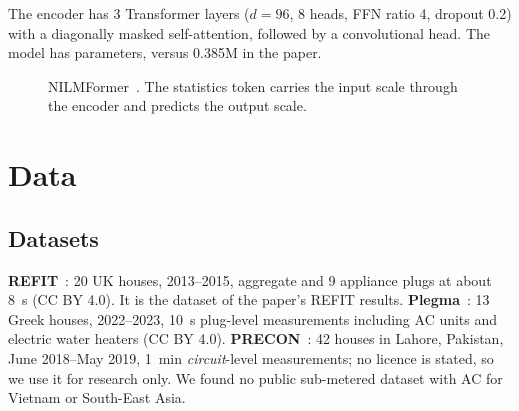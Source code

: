 \documentclass[conference]{IEEEtran}
\begin{document}
The encoder has 3 Transformer layers ($d=96$, 8 heads, FFN ratio 4, dropout 0.2) with a
diagonally masked self-attention, followed by a convolutional head. The model has \NParams{}
parameters, versus 0.385M in the paper.

\begin{figure}[t]
\centering
{}
\caption{NILMFormer~\cite{petralia2025nilmformer}. The statistics token carries the input scale
through the encoder and predicts the output scale.}
\label{fig:arch}
\end{figure}

\section{Data}\label{sec:data}
\subsection{Datasets}
\textbf{REFIT}~\cite{murray2017refit}: 20 UK houses, 2013--2015, aggregate and 9 appliance plugs
at about 8~s (CC BY 4.0). It is the dataset of the paper's REFIT results.
\textbf{Plegma}~\cite{athanasoulias2024plegma}: 13 Greek houses, 2022--2023, 10~s plug-level
measurements including AC units and electric water heaters (CC BY 4.0).
\textbf{PRECON}~\cite{nadeem2019precon}: 42 houses in Lahore, Pakistan, June 2018--May 2019, 1~min
\emph{circuit}-level measurements; no licence is stated, so we use it for research only.
We found no public sub-metered dataset with AC for Vietnam or South-East Asia.
\end{document}
